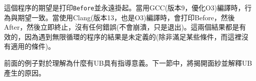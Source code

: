 這個程序的期望是打印\texttt{Before}並永遠掛起。當用GCC(版本9，優化O3)編譯時，行為與期望一致。當使用Clang(版本13，也是O3)編譯時，會打印Before，然後After，然後立即終止，沒有任何錯誤(不會崩潰，只是退出)。這兩個結果都是有效的，因為遇到無限循環的程序的結果是未定義的(除非滿足某些條件，而這裡沒有適用的條件)。

前面的例子對於理解為什麼有UB具有指導意義。下一節中，將揭開面紗並解釋UB產生的原因。

























